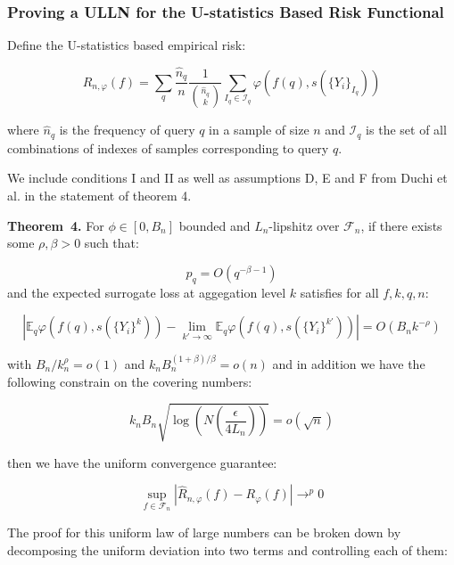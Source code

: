 \documentclass[a4paper,10pt]{article}
\newenvironment{theorem}[1][]{\par\medskip
   \noindent \textbf{Theorem~#1.} \rmfamily}{\medskip}
\begin{document}
\subsubsection{Proving a ULLN for the U-statistics Based Risk Functional}

Define the U-statistics based empirical risk:

\begin{equation}\label{eq:er}
  \hat{R}_{n, \varphi}(f) = \sum_q \frac{\hat{n}_q}{n} \frac{1}{\binom{\hat{n}_q}{k}} \sum_{I_q \in \mathcal{I}_q}\varphi(f(q), s(\{Y_i\}_{I_q}))
\end{equation}

where \(\hat{n}_q\) is the frequency of query \(q\) in a sample of size \(n\) and \(\mathcal{I}_q\) is the set of all combinations of indexes of samples corresponding to query \(q\).

We include conditions I and II as well as assumptions D, E and F from Duchi et al. \cite{duchi-2013-ranking} in the statement of theorem 4.
\begin{theorem}[4]
  For \(\phi \in [0, B_n]\) bounded and \(L_n\)-lipshitz over \(\mathcal{F}_n\),
  if there exists some \(\rho, \beta > 0\) such that:

  \begin{equation}
    p_q = O(q^{-\beta -1})
  \end{equation}
  and the expected surrogate loss at aggegation level \(k\) satisfies for all \(f, k, q, n\):

  \begin{equation}
    \left|\mathbb{E}_q\varphi(f(q), s(\{Y_i\}^k)) - \lim_{k' \rightarrow \infty}\mathbb{E}_q\varphi(f(q), s(\{Y_i\}^{k'}))\right| = O(B_nk^{-\rho})
  \end{equation}

  with \(B_n/k_n^\rho = o(1)\) and \(k_nB_n^{(1+\beta)/\beta}=o(n)\) and in addition we have the following constrain on the covering numbers:

  \begin{equation}
    k_nB_n\sqrt{\log\left( N(\frac{\epsilon}{4L_n}) \right)} = o(\sqrt n)
  \end{equation}

  then we have the uniform convergence guarantee:

  \begin{equation}
    \sup_{f \in \mathcal{F}_n}\left| \hat{R}_{n, \varphi}(f) - R_\varphi(f) \right| \rightarrow^p 0
  \end{equation}


\end{theorem}
The proof for this uniform law of large numbers can be broken down by decomposing the uniform deviation into two terms and controlling each of them:
\end{document}
